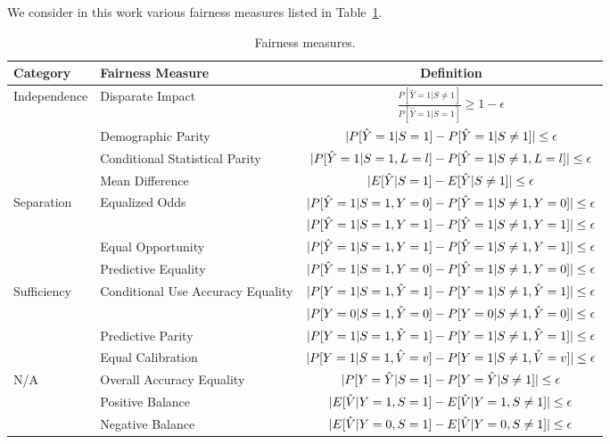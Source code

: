 \documentclass[manuscript,screen,review,anonymous]{acmart}
\DeclarePairedDelimiter{\abs}{\lvert}{\rvert}
\begin{document}
We consider in this work various fairness measures listed in Table~\ref{tab:measures}.

\begin{table}[h]
\caption{Fairness measures.}
\label{tab:measures}
\begin{tabular}{llc}
\toprule
\textbf{Category} & \textbf{Fairness Measure} & \textbf{Definition} \\
\midrule
\multirow{4}{*}{Independence} & Disparate Impact & $\frac{P[\hat{Y} = 1 | S \neq 1]}{P[\hat{Y} = 1 | S = 1]} \geq 1 - \epsilon$ \\
& Demographic Parity & $\abs{P[\hat{Y} = 1 | S = 1] - P[\hat{Y} = 1 | S \neq 1]} \leq \epsilon$ \\
& Conditional Statistical Parity & $\abs{P[\hat{Y} = 1 | S = 1, L = l] - P[\hat{Y} = 1 | S \neq 1, L = l]} \leq \epsilon$ \\
& Mean Difference & $\abs{E[\hat{Y}|S = 1] - E[\hat{Y}|S \neq 1]} \leq \epsilon$ \\
\multirow{4}{*}{Separation} & \multirow{2}{*}{Equalized Odds} & $\abs{P[\hat{Y} = 1 | S = 1, Y = 0] - P[\hat{Y} = 1 | S \neq 1, Y = 0]} \leq \epsilon$ \\
& & $\abs{P[\hat{Y} = 1 | S = 1, Y = 1] - P[\hat{Y} = 1 | S \neq 1, Y = 1]} \leq \epsilon$ \\
& Equal Opportunity & $\abs{P[\hat{Y} = 1 | S = 1, Y = 1] - P[\hat{Y} = 1 | S \neq 1, Y = 1]} \leq \epsilon$ \\
& Predictive Equality & $\abs{P[\hat{Y} = 1 | S = 1, Y = 0] - P[\hat{Y} = 1 | S \neq 1, Y = 0]} \leq \epsilon$ \\
\multirow{4}{*}{Sufficiency} & \multirow{2}{*}{Conditional Use Accuracy Equality} & $\abs{P[Y = 1 | S = 1, \hat{Y} = 1] - P[Y = 1 | S \neq 1, \hat{Y} = 1]} \leq \epsilon$ \\
& & $\abs{P[Y = 0 | S = 1, \hat{Y} = 0] - P[Y = 0 | S \neq 1, \hat{Y} = 0]} \leq \epsilon$ \\
& Predictive Parity & $\abs{P[Y = 1 | S = 1, \hat{Y} = 1] - P[Y = 1 | S \neq 1, \hat{Y} = 1]} \leq \epsilon$ \\
& Equal Calibration & $\abs{P[Y = 1 | S = 1, \hat{V} = v] - P[Y = 1 | S \neq 1, \hat{V} = v]} \leq \epsilon$ \\
\multirow{3}{*}{N/A} & Overall Accuracy Equality & $\abs{P[Y = \hat{Y} | S = 1] - P[Y = \hat{Y} | S \neq 1]} \leq \epsilon$ \\
& Positive Balance & $\abs{E[\hat{V} | Y = 1, S = 1] - E[\hat{V} | Y = 1, S \neq 1]} \leq \epsilon$ \\
& Negative Balance & $\abs{E[\hat{V} | Y = 0, S = 1] - E[\hat{V} | Y = 0, S \neq 1]} \leq \epsilon$ \\
\bottomrule
\end{tabular}
\end{table}
\end{document}
